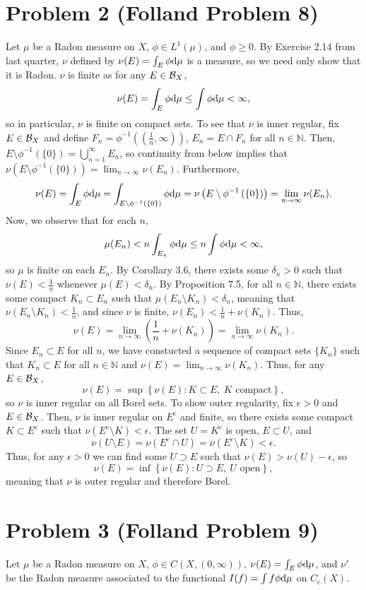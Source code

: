 \documentclass{article}
\begin{document}
\section{Problem 2 (Folland Problem 8)}
Let $\mu$ be a Radon measure on $X$, $\phi\in L^1(\mu)$, and $\phi\geq0$. By Exercise 2.14 from last quarter, $\nu$ defined by $\nu(E)=\int_E\phi\mathrm{d}\mu$ is a measure, so we need only show that it is Radon. $\nu$ is finite as for any $E\in{\cal B}_X$,
\[
\nu(E)=\int_E\phi\mathrm{d}\mu\leq\int\phi\mathrm{d}\mu<\infty,
\]
so in particular, $\nu$ is finite on compact sets. To see that $\nu$ is inner regular, fix $E\in{\cal B}_X$ and define $F_n=\phi^{-1}\left(\left(\frac{1}{n},\infty\right)\right)$, $E_n=E\cap F_n$ for all $n\in\mathbb{N}$. Then, $E\setminus\phi^{-1}\left(\{0\}\right)=\bigcup_{n=1}^\infty E_n$, so continuity from below implies that $\nu\left(E\setminus\phi^{-1}\left(\{0\}\right)\right)=\lim_{n\to\infty}\nu(E_n)$. Furthermore,
\[
\nu(E)=\int_E\phi\mathrm{d}\mu=\int_{E\setminus\phi^{-1}\left(\{0\}\right)}\phi\mathrm{d}\mu=\nu\left(E\setminus\phi^{-1}\left(\{0\}\right)\right)=\lim_{n\to\infty}\nu(E_n).
\]
Now, we observe that for each $n$,
\[
\mu(E_n)<n\int_{E_n}\phi\mathrm{d}\mu\leq n\int\phi\mathrm{d}\mu<\infty,
\]
so $\mu$ is finite on each $E_n$. By Corollary 3.6, there exists some $\delta_n>0$ such that $\nu(E)<\frac{1}{n}$ whenever $\mu(E)<\delta_n$. By Proposition 7.5, for all $n\in\mathbb{N}$, there exists some compact $K_n\subset E_n$ such that $\mu(E_n\setminus K_n)<\delta_n$, meaning that $\nu(E_n\setminus K_n)<\frac{1}{n}$, and since $\nu$ is finite, $\nu(E_n)<\frac{1}{n}+\nu(K_n)$. Thus,
\[
\nu(E)=\lim_{n\to\infty}\left(\frac{1}{n}+\nu(K_n)\right)=\lim_{n\to\infty}\nu(K_n).
\]
Since $E_n\subset E$ for all $n$, we have constucted a sequence of compact sets $\{K_n\}$ such that $K_n\subset E$ for all $n\in\mathbb{N}$ and $\nu(E)=\lim_{n\to\infty}\nu(K_n)$. Thus, for any $E\in{\cal B}_X$,
\[
\nu(E)=\sup\left\{\nu(E):K\subset E,~K\text{ compact}\right\},
\]
so $\nu$ is inner regular on all Borel sets. To show outer regularity, fix $\epsilon>0$ and $E\in{\cal B}_X$. Then, $\nu$ is inner regular on $E^c$ and finite, so there exists some compact $K\subset E^c$ such that $\nu(E^c\setminus K)<\epsilon$. The set $U=K^c$ is open, $E\subset U$, and
\[
\nu(U\setminus E)=\nu(E^c\cap U)=\nu(E^c\setminus K)<\epsilon.
\]
Thus, for any $\epsilon>0$ we can find some $U\supset E$ such that $\nu(E)>\nu(U)-\epsilon$, so
\[
\nu(E)=\inf\left\{\nu(E):U\supset E,~U\text{ open}\right\},
\]
meaning that $\nu$ is outer regular and therefore Borel.

\section{Problem 3 (Folland Problem 9)}
Let $\mu$ be a Radon measure on $X$, $\phi\in C(X,(0,\infty))$, $\nu(E)=\int_E\phi\mathrm{d}\mu$, and $\nu'$ be the Radon measure associated to the functional $I(f)=\int f\phi\mathrm{d}\mu$ on $C_c(X)$. 
\end{document}
